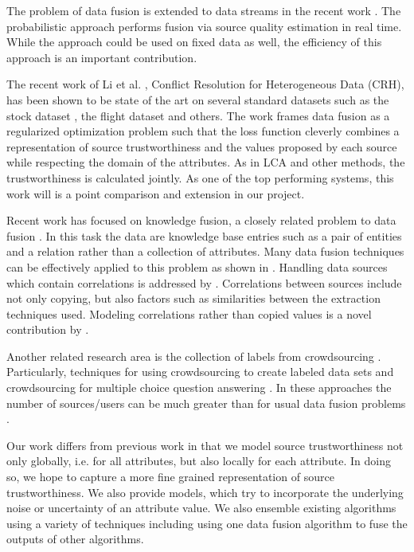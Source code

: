 \documentclass{acm_proc_article-sp}
\begin{document}
The problem of data fusion is extended to data streams in the recent work \cite{zhao:truth}. The probabilistic approach performs fusion via source quality estimation in real time. While the approach could be used on fixed data as well, the efficiency of this approach is an important contribution. 

The recent work of Li et al. \cite{li:resolving}, Conflict Resolution for Heterogeneous Data (CRH), has been shown to be state of the art on several standard datasets such as the stock dataset \cite{li:truth}, the flight dataset \cite{li:truth} and others. The work frames data fusion as a regularized optimization problem such that the loss function cleverly combines a representation of source trustworthiness and the values proposed by each source while respecting the domain of the attributes. As in LCA and other methods, the trustworthiness is calculated jointly. As one of the top performing systems, this work will is a point comparison and extension in our project. 

Recent work has focused on knowledge fusion, a closely related problem to data fusion \cite{dong:data} \cite{pochampally:fusing} \cite{yu:wisdom}.  In this task the data are knowledge base entries such as a pair of entities and a relation rather than a collection of attributes. Many data fusion techniques can be effectively applied to this problem as shown in \cite{dong:data}. Handling data sources which contain correlations is addressed by \cite{pochampally:fusing}. Correlations between sources include not only copying, but also factors such as similarities between the extraction techniques used. Modeling correlations rather than copied values is a novel contribution by  \cite{pochampally:fusing}.


Another related research area is the collection of labels from crowdsourcing \cite{nguyen:minimizing}. Particularly, techniques for using crowdsourcing to create labeled data sets \cite{sheng:get} \cite{nguyen:minimizing} and crowdsourcing for multiple choice question answering \cite{bachrach:grade}. In these approaches the number of sources/users can be much greater than for usual data fusion problems \cite{li:truth} \cite{nguyen:minimizing}.

Our work differs from previous work in that we model source trustworthiness not only globally, i.e. for all attributes, but also locally for each attribute. In doing so, we hope to capture a more fine grained representation of source trustworthiness. We also provide models, which try to incorporate the underlying noise or uncertainty of an attribute value. We also ensemble existing algorithms using a variety of techniques including using one data fusion algorithm to fuse the outputs of other algorithms. 
\end{document}
